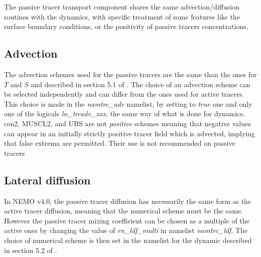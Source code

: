 \documentclass[../main/TOP_manual]{subfiles}
\begin{document}
The passive tracer transport component  shares the same advection/diffusion routines with the dynamics, with specific treatment of some features like the surface boundary conditions, or the positivity of passive tracers concentrations.

 \subsection{ Advection}
The advection schemes used for the passive tracers are the same than the ones for $T$ and $S$ and described in section 5.1 of \citep{nemo_manual}. The choice of an advection scheme  can be selected independently and  can differ from the ones used for active tracers. This choice is made in the \textit{namtrc\_adv} namelist, by  setting to \textit{true} one and only one of the logicals \textit{ln\_trcadv\_xxx}, the same way of what is done for dynamics.
cen2, MUSCL2, and UBS are not \textit{positive} schemes meaning that negative values can appear in an initially strictly positive tracer field which is advected, implying that false extrema are permitted. Their use is not recommended on passive tracers

 \subsection{ Lateral diffusion}
In NEMO v4.0, the passive tracer diffusion has necessarily the same form as the active tracer diffusion, meaning that the numerical scheme must be the same. However the passive tracer mixing coefficient can be chosen as a multiple of the active ones by changing the value of \textit{rn\_ldf\_multi} in namelist \textit{namtrc\_ldf}. The choice of numerical scheme is then set  in the  namelist for the dynamic described in section 5.2 of \citep{nemo_manual}.


\end{document}
